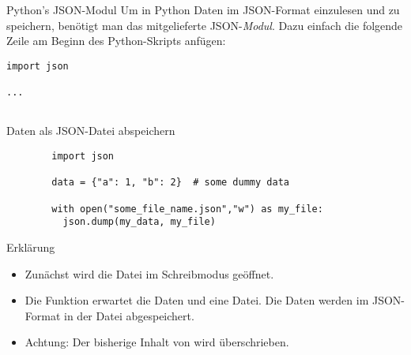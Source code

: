 \begin{fragile}
	
\begin{block}{Python's JSON-Modul}
\vspace{2pt}
Um in Python Daten im JSON-Format einzulesen und zu speichern, benötigt man das mitgelieferte JSON-\emph{Modul}. 
Dazu einfach die folgende Zeile am Beginn des Python-Skripts anfügen: 

\pause 

\begin{verbatim}
import json 

...


\end{verbatim}
\end{block}	

\end{fragile}


\begin{fragile}
	\begin{block}{Daten als JSON-Datei abspeichern}
		\vspace{2pt}
		
		\begin{verbatim}
		import json 
		
		data = {"a": 1, "b": 2}  # some dummy data
		
		with open("some_file_name.json","w") as my_file:
		  json.dump(my_data, my_file)
		\end{verbatim}
		
		\pause
		
		\vspace{12pt}
		
		\begin{exampleblock}{Erklärung}
			\vspace{2pt}
			\begin{itemize}[<+->]
				\item Zunächst wird die Datei  im Schreibmodus geöffnet.  
				\item Die Funktion  erwartet die Daten und eine Datei. Die Daten werden im JSON-Format in der Datei abgespeichert. 
				\item Achtung: Der bisherige Inhalt von  wird überschrieben.  
			\end{itemize}
		\end{exampleblock}
	\end{block}
\end{fragile}


